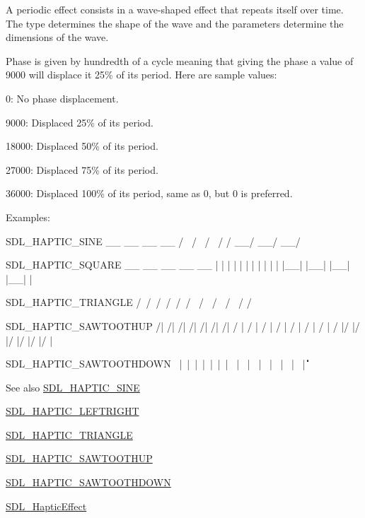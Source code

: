 A periodic effect consists in a wave-\/shaped effect that repeats itself over time. The type determines the shape of the wave and the parameters determine the dimensions of the wave.

Phase is given by hundredth of a cycle meaning that giving the phase a value of 9000 will displace it 25\% of its period. Here are sample values\+:
\begin{DoxyItemize}
\item 0\+: No phase displacement.
\item 9000\+: Displaced 25\% of its period.
\item 18000\+: Displaced 50\% of its period.
\item 27000\+: Displaced 75\% of its period.
\item 36000\+: Displaced 100\% of its period, same as 0, but 0 is preferred.
\end{DoxyItemize}

Examples\+: \begin{DoxyVerb}SDL_HAPTIC_SINE
  __      __      __      __
 /  \    /  \    /  \    /
/    \__/    \__/    \__/

SDL_HAPTIC_SQUARE
 __    __    __    __    __
|  |  |  |  |  |  |  |  |  |
|  |__|  |__|  |__|  |__|  |

SDL_HAPTIC_TRIANGLE
  /\    /\    /\    /\    /\
 /  \  /  \  /  \  /  \  /
/    \/    \/    \/    \/

SDL_HAPTIC_SAWTOOTHUP
  /|  /|  /|  /|  /|  /|  /|
 / | / | / | / | / | / | / |
/  |/  |/  |/  |/  |/  |/  |

SDL_HAPTIC_SAWTOOTHDOWN
\  |\  |\  |\  |\  |\  |\  |
 \ | \ | \ | \ | \ | \ | \ |
  \|  \|  \|  \|  \|  \|  \|
\end{DoxyVerb}


\begin{DoxySeeAlso}{See also}
\hyperlink{_s_d_l__haptic_8h_aa6d75adbfcdda5075078e7a2849da5c0}{S\+D\+L\+\_\+\+H\+A\+P\+T\+I\+C\+\_\+\+S\+I\+NE} 

\hyperlink{_s_d_l__haptic_8h_ae047624d8458ff6400887c37a36f86d3}{S\+D\+L\+\_\+\+H\+A\+P\+T\+I\+C\+\_\+\+L\+E\+F\+T\+R\+I\+G\+HT} 

\hyperlink{_s_d_l__haptic_8h_ae8123eaa51511507375ba6ef9220fa46}{S\+D\+L\+\_\+\+H\+A\+P\+T\+I\+C\+\_\+\+T\+R\+I\+A\+N\+G\+LE} 

\hyperlink{_s_d_l__haptic_8h_ab8e3f40f3c2bcee8905d13b634363c3f}{S\+D\+L\+\_\+\+H\+A\+P\+T\+I\+C\+\_\+\+S\+A\+W\+T\+O\+O\+T\+H\+UP} 

\hyperlink{_s_d_l__haptic_8h_afd64aa747034a7ccf4b55f6246525701}{S\+D\+L\+\_\+\+H\+A\+P\+T\+I\+C\+\_\+\+S\+A\+W\+T\+O\+O\+T\+H\+D\+O\+WN} 

\hyperlink{union_s_d_l___haptic_effect}{S\+D\+L\+\_\+\+Haptic\+Effect} 
\end{DoxySeeAlso}


